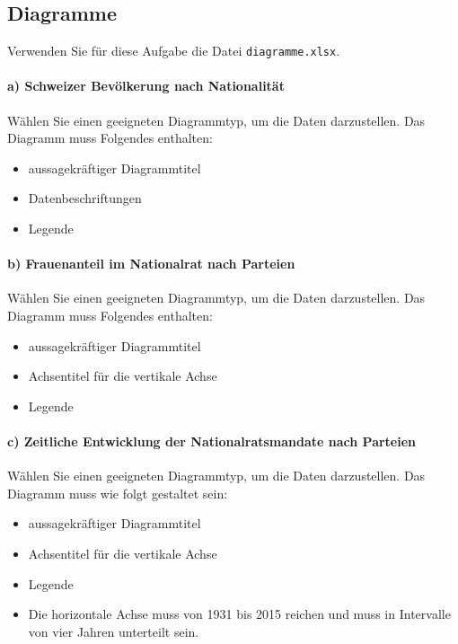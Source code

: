 \subsection{Diagramme}
\begin{mysubmission}[Diagramme]
    Verwenden Sie für diese Aufgabe die Datei \texttt{diagramme.xlsx}.

    \paragraph*{a) Schweizer Bevölkerung nach Nationalität}
    Wählen Sie einen geeigneten Diagrammtyp, um die Daten darzustellen. Das Diagramm muss Folgendes enthalten:
    \begin{itemize}
        \item aussagekräftiger Diagrammtitel
        \item Datenbeschriftungen
        \item Legende
    \end{itemize}

    \paragraph*{b) Frauenanteil im Nationalrat nach Parteien}
    Wählen Sie einen geeigneten Diagrammtyp, um die Daten darzustellen. Das Diagramm muss Folgendes enthalten:
    \begin{itemize}
        \item aussagekräftiger Diagrammtitel
        \item Achsentitel für die vertikale Achse
        \item Legende
    \end{itemize}

    \paragraph*{c) Zeitliche Entwicklung der Nationalratsmandate nach Parteien}
    Wählen Sie einen geeigneten Diagrammtyp, um die Daten darzustellen. Das Diagramm muss wie folgt gestaltet sein:
    \begin{itemize}
        \item aussagekräftiger Diagrammtitel
        \item Achsentitel für die vertikale Achse
        \item Legende
        \item Die horizontale Achse muss von 1931 bis 2015 reichen und muss in Intervalle von vier Jahren unterteilt sein.
    \end{itemize}


\end{mysubmission}
